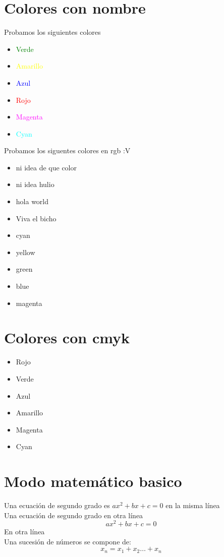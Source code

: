 \documentclass[10pt,a4paper]{article}
\begin{document}
\section{Colores con nombre}
Probamos los siguientes colores
\begin{itemize}
\item \textcolor{green}{Verde}
\item \textcolor{yellow}{Amarillo}
\item \textcolor{blue}{Azul}
\item \textcolor{red}{Rojo}
\item \textcolor{magenta}{Magenta}
\item \textcolor{cyan}{Cyan}
\end{itemize}
Probamos los siguentes colores en rgb :V
\begin{itemize}
\item \textcolor[rgb]{0.25,1,0.78}{ni idea de que color}
\item \textcolor[rgb]{0.32,0.145,0.200}{ni idea hulio} 
\item \textcolor[rgb]{0.122,0.55,1}{hola world}
\item \textcolor[rgb]{1,0,0}{Viva el bicho}
\item \textcolor[rgb]{0,1,1}{cyan}
\item \textcolor[rgb]{1,1,0}{yellow}
\item \textcolor[rgb]{0,1,0}{green}
\item \textcolor[rgb]{0,0,1}{blue}
\item \textcolor[rgb]{1,0,1}{magenta}
\end{itemize}
\section{Colores con cmyk}
\begin{itemize}
\item \textcolor[cmyk]{0,1,1,0}{Rojo}
\item \textcolor[cmyk]{1,0,1,0}{Verde}
\item \textcolor[cmyk]{1,1,0,0}{Azul}
\item \textcolor[cmyk]{0,0,1,0}{Amarillo}
\item \textcolor[cmyk]{0,1,0,0}{Magenta}
\item \textcolor[cmyk]{1,0,0,0}{Cyan}
\end{itemize}
\section{Modo matemático basico}
Una ecuación de segundo grado es
$ax^2+bx+c=0$ en la misma línea \\
Una ecuación de segundo grado en otra línea 
$$ax^2+bx+c=0$$ En otra línea \\
Una sucesión de números se compone de:
$$ x_n = x_1 + x_2 \ldots + x_n $$ 
\end{document}
